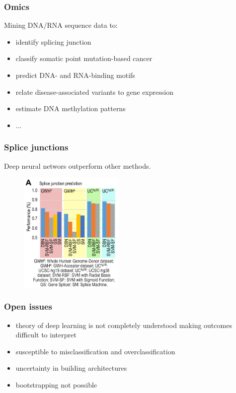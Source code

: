 \begin{frame}
	\frametitle{Omics}

	Mining DNA/RNA sequence data to:
	\begin{itemize}
		\item identify splicing junction
		\item classify somatic point mutation-based cancer
		\item predict DNA- and RNA-binding motifs
		\item relate disease-associated variants to gene expression
		\item estimate DNA methylation patterns
		\item ...
	\end{itemize}

\end{frame}

\begin{frame}
	\frametitle{Splice junctions}

	\vskip 0.3cm
	Deep neural networs outperform other methods.

	\begin{figure}
                \includegraphics[width=0.45\textwidth]{Pics/splice.png}
        \end{figure}

\end{frame}

\begin{frame}
	\frametitle{Open issues}

	\begin{itemize}
		\item theory of deep learning is not completely understood making outcomes difficult to interpret
		\item susceptible to misclassification and overclassification
		\item uncertainty in building architectures
		\item bootstrapping not possible
	\end{itemize}

\end{frame}

